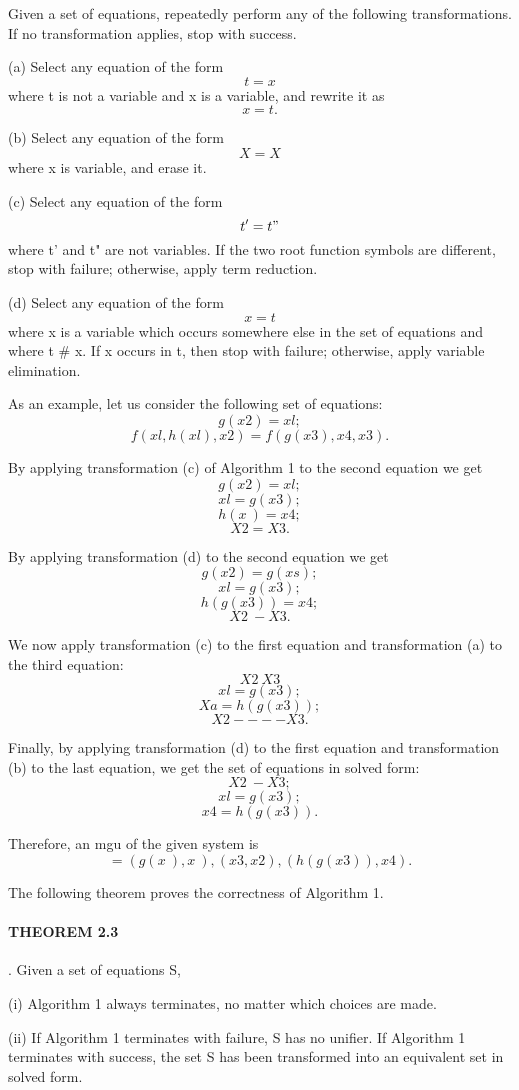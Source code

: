 Given a set of equations, repeatedly perform any of the following transformations. If no
transformation applies, stop with success. 

(a) Select any equation of the form
\[t=x\]
where t is not a variable and x is a variable, and rewrite it as 
\[x=t.\]

(b) Select any equation of the form
\[X=X\] 
where x is variable, and erase it.  

(c) Select any equation of the form
\[t' = t"\]
where t' and t" are not variables. If the two root function symbols are different, stop with
failure; otherwise, apply term reduction. 

(d) Select any equation of the form
\[x=t\]
where x is a variable which occurs somewhere else in the set of equations and
where t \# x. If x occurs in t, then stop with failure; otherwise, apply variable elimination. 

As an example, let us consider the following set of equations:
\[g(x2) = xl;\]
\[f(xl, h(xl), x2) = f(g(x3), x4, x3).\]

By applying transformation (c) of Algorithm 1 to the second equation we get
\[g(x2) = xl;\]
\[xl = g(x3);\]
\[h(x~) = x4;\]
\[X2 =X3.\]

By applying transformation (d) to the second equation we get
\[g(x2) = g(xs);\]
\[xl = g(x3);\]
\[h(g(x3)) = x4;\]
\[X2 ~- X3.\]

We now apply transformation (c) to the first equation and transformation (a) to
the third equation:
\[X2 ~ X3\]
\[xl = g(x3);\]
\[Xa = h(g(x3));\]
\[X2 ----X3.\]

Finally, by applying transformation (d) to the first equation and transformation
(b) to the last equation, we get the set of equations in solved form:
\[X2 ~- X3 ;\]
\[xl = g(x3);\]
\[x4 = h(g(x3)).\]

Therefore, an mgu of the given system is
\[= {(g(x~), x~), (x3, x2), (h(g(x3)), x4)}.\] 

The following theorem proves the correctness of Algorithm 1. 

\paragraph{THEOREM 2.3}. Given a set of equations S,

(i) Algorithm 1 always terminates, no matter which choices are made.

(ii) If Algorithm 1 terminates with failure, S has no unifier. If Algorithm 1
terminates with success, the set S has been transformed into an equivalent
set in solved form. 
 
